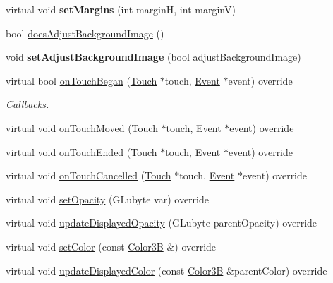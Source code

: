 \begin{DoxyCompactItemize}
\item 
\mbox{\label{classControlButton_ac49bd52dbb88244757762320e480caf6}} 
virtual void {\bfseries set\+Margins} (int marginH, int marginV)
\item 
bool \hyperlink{classControlButton_a35b9bc222f10096a0c9122dc87ae82aa}{does\+Adjust\+Background\+Image} ()
\item 
\mbox{\label{classControlButton_a88a870284768d1de8371832ecdfa52c3}} 
void {\bfseries set\+Adjust\+Background\+Image} (bool adjust\+Background\+Image)
\item 
virtual bool \hyperlink{classControlButton_a1f4736ab73edd357bf9caf9fa0e1dcd6}{on\+Touch\+Began} (\hyperlink{classTouch}{Touch} $\ast$touch, \hyperlink{classEvent}{Event} $\ast$event) override
\begin{DoxyCompactList}\small\item\em Callbacks. \end{DoxyCompactList}\item 
virtual void \hyperlink{classControlButton_aacecc916b91af98f4f9a2550d678bd44}{on\+Touch\+Moved} (\hyperlink{classTouch}{Touch} $\ast$touch, \hyperlink{classEvent}{Event} $\ast$event) override
\item 
virtual void \hyperlink{classControlButton_a6f562dc0b399591189883ea7788603d7}{on\+Touch\+Ended} (\hyperlink{classTouch}{Touch} $\ast$touch, \hyperlink{classEvent}{Event} $\ast$event) override
\item 
virtual void \hyperlink{classControlButton_a95558febae1ea6790245d093766ba20e}{on\+Touch\+Cancelled} (\hyperlink{classTouch}{Touch} $\ast$touch, \hyperlink{classEvent}{Event} $\ast$event) override
\item 
virtual void \hyperlink{classControlButton_aa6076ef32569a9be5361f12bf00d4aa1}{set\+Opacity} (G\+Lubyte var) override
\item 
virtual void \hyperlink{classControlButton_a51a1da3e1972b7e1d98e2318feaf498e}{update\+Displayed\+Opacity} (G\+Lubyte parent\+Opacity) override
\item 
virtual void \hyperlink{classControlButton_a7a6e29777bb4a89dab5ac436d92287ac}{set\+Color} (const \hyperlink{structColor3B}{Color3B} \&) override
\item 
virtual void \hyperlink{classControlButton_a3f7857c3ce4bec5b375db1a6efea5920}{update\+Displayed\+Color} (const \hyperlink{structColor3B}{Color3B} \&parent\+Color) override
\item 

\end{DoxyCompactItemize}
